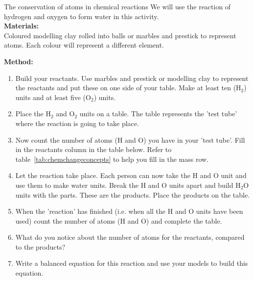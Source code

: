             \begin{activity}{The conservation of atoms in chemical reactions }
            \nopagebreak
            \label{m38711*id64844}\noindent
We will use the reaction of hydrogen and oxygen to form water in this activity.\\
\textbf{Materials:} \\ Coloured modelling clay rolled into balls or marbles and prestick to represent atoms. Each colour will represent a different element.
        \par 
      \label{m38711*id64882}\noindent
\textbf{Method:}\\
      \label{m38711*id64889}\begin{enumerate}[noitemsep, label=\textbf{\arabic*}. ] 
\item Build your reactants. Use marbles and prestick or modelling clay to represent the reactants and put these on one side of your table. Make at least ten ($\text{H}_{2}$) units and at least five ($\text{O}_{2}$) units.
\item Place the $\text{H}_{2}$ and $\text{O}_{2}$ units on a table. The table represents the 'test tube' where the reaction is going to take place. 
\item Now count the number of atoms ($\text{H}$ and $\text{O}$) you have in your 'test tube'. Fill in the reactants column in the table below. Refer to table~\ref{tab:chemchangeconcepts} to help you fill in the mass row.
\item Let the reaction take place. Each person can now take the $\text{H}$ and $\text{O}$ unit and use them to make water units. Break the $\text{H}$ and $\text{O}$ units apart and build $\text{H}_{2}\text{O}$ units with the parts. These are the products. Place the products on the table.
\item When the 'reaction' has finished (i.e. when all the $\text{H}$ and $\text{O}$ units have been used) count the number of atoms ($\text{H}$ and $\text{O}$) and complete the table.
\item What do you notice about the number of atoms for the reactants, compared to the products?
\item Write a balanced equation for this reaction and use your models to build this equation.
\end{enumerate}
        \par 
\begin{table}[H]
 \begin{center}
  \begin{tabular}{|l|l||l|} \hline

\end{tabular}
\end{center}
\end{table}
\end{activity}
